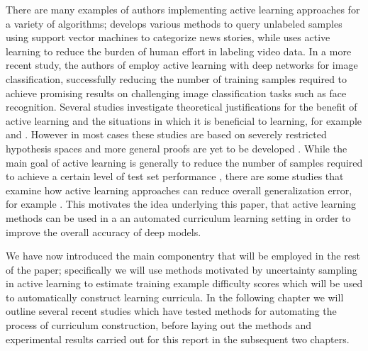 There are many examples of authors implementing active learning approaches for a variety of algorithms; \cite{tong2001support} develops various methods to query unlabeled samples using support vector machines to categorize news stories, while \cite{yang2003automatically} uses active learning to reduce the burden of human effort in labeling video data. In a more recent study, the authors of \cite{wang2017cost} employ active learning with deep networks for image classification, successfully reducing the number of training samples required to achieve promising results on challenging image classification tasks such as face recognition. Several  studies investigate theoretical justifications for the benefit of active learning and the situations in which it is beneficial to learning, for example \cite{balcan2006agnostic} and \cite{balcan2010true}. However in most cases these studies are based on severely restricted hypothesis spaces and more general proofs are yet to be developed \cite{settles2012active}. While the main goal of active learning is generally to reduce the number of samples required to achieve a certain level of test set performance \cite{settles2012active}, there are some studies that examine how active learning approaches can reduce overall generalization error, for example \cite{cohn1994improving}. This motivates the idea underlying this paper, that active learning methods can be used in a an automated curriculum learning setting in order to improve the overall accuracy of deep models. 

We have now introduced the main componentry that will be employed in the rest of the paper; specifically we will use methods motivated by uncertainty sampling in active learning to estimate training example difficulty scores which will be used to automatically construct learning curricula. In the following chapter we will outline several recent studies which have tested methods for automating the process of curriculum construction, before laying out the methods and experimental results carried out for this report in the subsequent two chapters. 
